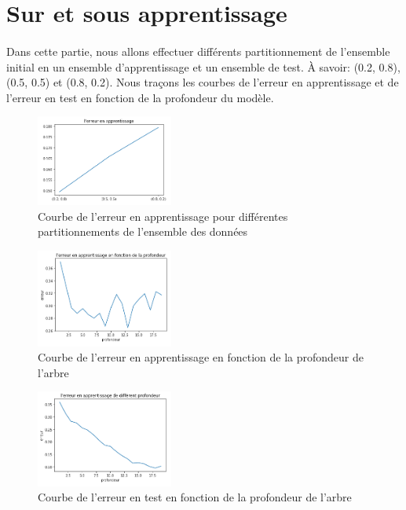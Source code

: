 \documentclass{report}
\begin{document}
\section{Sur et sous apprentissage}
\paragraph{}
Dans cette partie, nous allons effectuer différents partitionnement de l'ensemble initial en un ensemble d'apprentissage et un ensemble de test. À savoir: (0.2, 0.8), (0.5, 0.5) et (0.8, 0.2). Nous traçons les courbes de l'erreur en apprentissage et de l’erreur en test en fonction de la profondeur du
modèle. 

\begin{figure}[H]
  \begin{center}
    \includegraphics[width=0.4\textwidth]{erreur_app_part.png}
    \caption{Courbe de l’erreur en apprentissage pour différentes partitionnements de l'ensemble des données}
  \end{center}
\end{figure}


\begin{figure}[H]
  \begin{center}
    \includegraphics[width=0.4\textwidth]{erreur_app.png}
    \caption{Courbe de l’erreur en apprentissage en fonction de la profondeur de l'arbre}
  \end{center}
\end{figure}

\begin{figure}[H]
	\begin{center}
		\includegraphics[width=0.4\textwidth]{erreur_test.png}
		\caption{Courbe de l’erreur en test en fonction de la profondeur de l'arbre}
	\end{center}
\end{figure}
\end{document}
